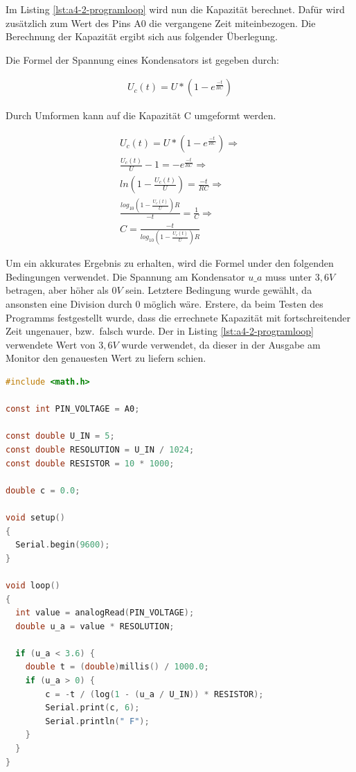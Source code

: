 Im Listing \ref{lst:a4-2-programloop} wird nun die Kapazität berechnet.
Dafür wird zusätzlich zum Wert des Pins A0 die vergangene Zeit miteinbezogen.
Die Berechnung der Kapazität ergibt sich aus folgender Überlegung.

Die Formel der Spannung eines Kondensators ist gegeben durch:

\begin{align}
    U_c(t) = U * (1 - e^{\frac{-t}{RC}})
\end{align}

Durch Umformen kann auf die Kapazität C umgeformt werden.

\begin{align}
    U_c(t) = U * (1 - e^{\frac{-t}{RC}}) \Rightarrow \\
    \frac{U_c(t)}{U} - 1 = -e^{\frac{-t}{RC}} \Rightarrow \\
    ln(1 - \frac{U_c(t)}{U}) = \frac{-t}{RC} \Rightarrow \\
    \frac{log_{10}(1 - \frac{U_c(t)}{U}) R}{-t} = \frac{1}{C} \Rightarrow \\
    C = \frac{-t}{log_{10}(1 - \frac{ U_c(t)}{U}) R}
\end{align}

Um ein akkurates Ergebnis zu erhalten, wird die Formel under den folgenden Bedingungen verwendet.
Die Spannung am Kondensator $u\_a$ muss unter $3,6V$ betragen, aber höher als $0V$ sein.
Letztere Bedingung wurde gewählt, da ansonsten eine Division durch $0$ möglich wäre.
Erstere, da beim Testen des Programms festgestellt wurde, dass die errechnete Kapazität mit fortschreitender Zeit ungenauer, bzw.\ falsch wurde.
Der in Listing \ref{lst:a4-2-programloop} verwendete Wert von $3,6V$ wurde verwendet, da dieser in der Ausgabe am Monitor den genauesten Wert zu liefern schien.

\begin{lstlisting}[language=C,label={lst:a4-2-programmcode}, caption={Vollständiger Programmcode der Aufgabe 4.2}]
#include <math.h>

const int PIN_VOLTAGE = A0;

const double U_IN = 5;
const double RESOLUTION = U_IN / 1024;
const double RESISTOR = 10 * 1000;

double c = 0.0;

void setup()
{
  Serial.begin(9600);
}

void loop()
{
  int value = analogRead(PIN_VOLTAGE);
  double u_a = value * RESOLUTION;

  if (u_a < 3.6) {
    double t = (double)millis() / 1000.0;
    if (u_a > 0) {
    	c = -t / (log(1 - (u_a / U_IN)) * RESISTOR);
        Serial.print(c, 6);
        Serial.println(" F");
    }
  }
}
\end{lstlisting}

